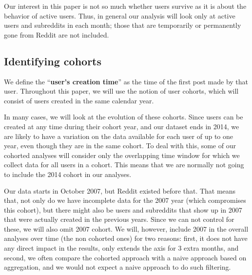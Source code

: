 Our interest in this paper is not so much whether users survive as it is about the behavior of active users.  Thus, 
in general our analysis will look only at active users and subreddits in each month; those that are temporarily or permanently gone from Reddit are not included.  

\subsection{Identifying cohorts}

We define the ``\textbf{user's creation time}'' as the time of the first post made by that user.  Throughout this paper, we will use the notion of user cohorts, which will consist of users created in the same calendar year.

In many cases, we will look at the evolution of these cohorts. Since users can be created at any time during their cohort year, and our dataset ends in 2014, 
we are likely to have a variation on the data available for each user of up to one year, even though they are in the same cohort.  To deal with this, some of our cohorted analyses will consider only the overlapping time window for which we collect data for all users in a cohort.   This means that we are normally not going to include the 2014 cohort in our analyses.

Our data starts in October 2007, but Reddit existed before that. That means that, not only do we have incomplete data for the 2007 year (which compromises this cohort), but there might also be users and subreddits that show up in 2007 that were actually created in the previous years. Since we can not control for these, we will also omit 2007 cohort. We will, however, include 2007 in the overall analyses over time (the non cohorted ones) for two reasons: first, it does not have any direct impact in the results, only extends the axis for 3 extra months, and second, we often compare the cohorted approach with a naive approach based on aggregation, and we would not expect a naive approach to do such filtering. 
